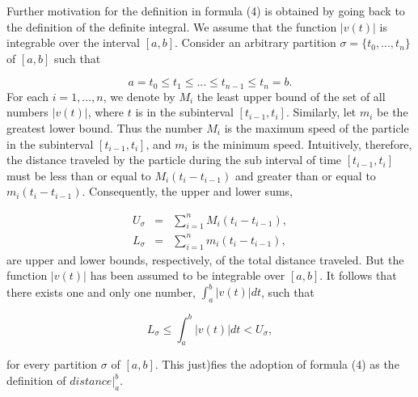 Further motivation for the definition in formula (4) is obtained by going back to the definition of the definite integral. We assume that the function $|v(t)|$ is integrable over the interval $[a, b]$. Consider an arbitrary partition $\sigma = \{ t_0,..., t_n \} $ of $[a, b]$ such that

$$
a = t_0 \leq t_1 \leq ... \leq t_{n-1} \leq t_n = b.
$$
\noindent For each $i = 1,..., n$, we denote by $M_i$ the least upper bound of the set of all numbers $|v(t)|$, where $t$ is in the subinterval $[t_{i-1}, t_i]$. Similarly, let $m_i$ be the greatest lower bound. Thus the number $M_i$ is the maximum speed of the particle in the subinterval $[t_{i-1}, t_i]$, and $m_i$ is the minimum speed. Intuitively, therefore, the distance traveled by the particle during the sub
interval of time $[t_{i-1}, t_i]$ must be less than or equal to $M_i(t_{i} - t_{i - 1})$ and greater than or equal to $m_i(t_{i} - t_{i - 1})$. Consequently, the upper and lower sums,

\begin{eqnarray*}
U_{\sigma} &=& \sum_{i = 1}^{n} M_i(t_{i} - t_{i-1}),  \\
L_{\sigma} &=& \sum_{i = 1}^{n} m_i(t_{i} - t_{i-1}),  
\end{eqnarray*}
\noindent are upper and lower bounds, respectively, of the total distance traveled. But the function $|v(t)|$ has been assumed to be integrable over $[a, b]$. It follows that there exists one and only one number, $\int_{a}^{b} |v(t)| dt$, such that

$$
L_{\sigma} \leq \int_{a}^{b}  |v(t)| dt < U_{\sigma},  
$$

\noindent for every partition $\sigma$ of $[a, b]$. This just)fies the adoption of formula (4) as the definition of $distance|_{a}^{b}$.


